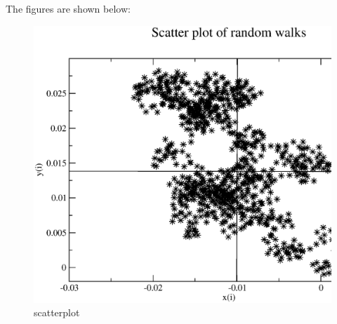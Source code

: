 \documentclass[11pt,a4paper,english]{article}
\begin{document}
		    The figures are shown below:\\
	\begin{figure}[h!]
	\centering
	\includegraphics [scale=0.6]{figures/hw8qn3f.eps}
	\caption{scatterplot }
	\end{figure}
	\clearpage
 
	
	
\end{document}
